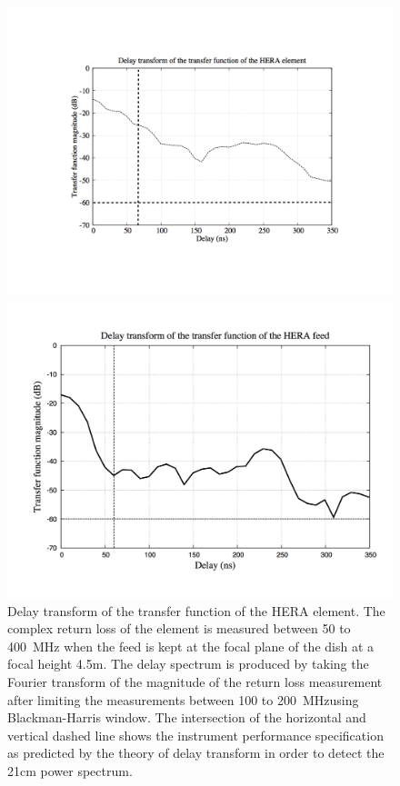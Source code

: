 \documentclass[iop]{emulateapj}
\begin{document}
\begin{figure}
\begin{minipage}[b]{0.5\linewidth}
\centering
\includegraphics[width=\linewidth]{plots1/delayspectrum.png}
\caption{Delay transform of the transfer function of the HERA element. The complex return loss of the element is measured between 50 to 400~MHz when the feed is kept at the focal plane of the dish at a focal height 4.5m. The delay spectrum is produced by taking the Fourier transform of the magnitude of the return loss measurement after limiting the measurements between 100 to 200~MHzusing Blackman-Harris window. The intersection of the horizontal and vertical dashed line shows the instrument performance specification as predicted by the theory of delay transform in order to detect the 21cm power spectrum.}
\label{fig:window}
\end{minipage}
\begin{minipage}[b]{0.5\linewidth}
\centering
\includegraphics[width=\linewidth]{plots1/delayspectrum_feed.png}

\end{minipage}
\end{figure}
\end{document}
